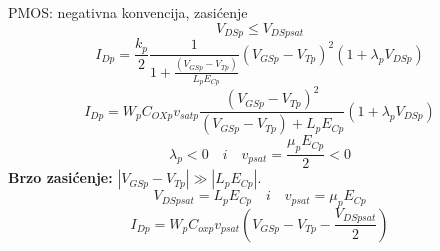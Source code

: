 \begin{frame}[label=09_2-s013]{PMOS: negativna konvencija, zasićenje}
\setlength{\abovedisplayskip}{3pt}\setlength{\belowdisplayskip}{3pt}
\[V_{DSp}\le V_{DSpsat}\]
\[I_{Dp}=\frac{k_p}2\frac1{1+\frac{(V_{GSp}-V_{Tp})}{L_pE_{Cp}}}(V_{GSp}-V_{Tp})^2(1+\lambda_pV_{DSp})\]
\[I_{Dp}=W_pC_{OXp}v_{satp}\frac{(V_{GSp}-V_{Tp})^2}{(V_{GSp}-V_{Tp})+L_pE_{Cp}}(1+\lambda_pV_{DSp})\]
\[\lambda_p<0\quad\textit{i}\quad v_{psat}=\frac{\mu_pE_{Cp}}2<0\]
\textbf{Brzo zasićenje:} $|V_{GSp}-V_{Tp}|\gg|L_pE_{Cp}|$.\[V_{DSpsat}=L_pE_{Cp}\quad\textit{i}\quad v_{psat}=\mu_pE_{Cp}\]
\[I_{Dp}=W_pC_{oxp}v_{psat}\left(V_{GSp}-V_{Tp}-\frac{V_{DSpsat}}2\right)\]

\end{frame}
